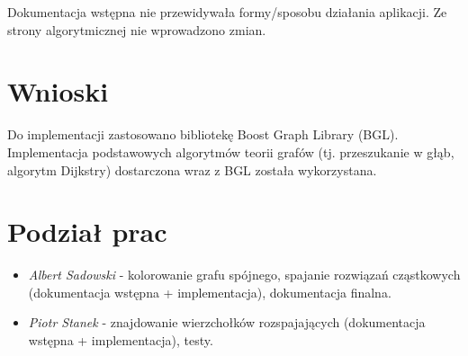 \documentclass[a4paper]{article}
\begin{document}
		Dokumentacja wstępna nie przewidywała formy/sposobu działania aplikacji. Ze strony algorytmicznej nie wprowadzono zmian.

	\section{Wnioski}

	Do implementacji zastosowano bibliotekę Boost Graph Library (BGL). Implementacja podstawowych algorytmów teorii grafów (tj. przeszukanie w głąb, algorytm Dijkstry) dostarczona wraz z BGL została wykorzystana.

	\section{Podział prac}	

	\begin{itemize}

		\item {\em Albert Sadowski} - kolorowanie grafu spójnego, spajanie rozwiązań cząstkowych (dokumentacja wstępna + implementacja), dokumentacja finalna.

		\item {\em Piotr Stanek} - znajdowanie wierzchołków rozspajających (dokumentacja wstępna + implementacja), testy.

	\end{itemize}
\end{document}
